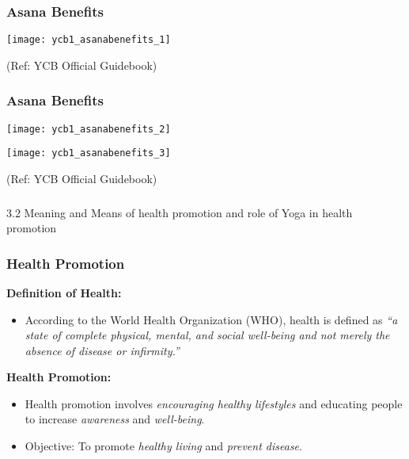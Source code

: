 \begin{frame}[fragile]\frametitle{Asana Benefits}


		\begin{center}
		\texttt{[image: ycb1\_asanabenefits\_1]}
				
		\end{center}	

  
		{\tiny (Ref: YCB Official Guidebook)}		
  
\end{frame}



\begin{frame}[fragile]\frametitle{Asana Benefits}


		\begin{center}
		\texttt{[image: ycb1\_asanabenefits\_2]}
		
		\texttt{[image: ycb1\_asanabenefits\_3]}
		
				
		\end{center}	

  
		{\tiny (Ref: YCB Official Guidebook)}		
  
\end{frame}


\begin{frame}[fragile]\frametitle{}
\begin{center}
{\Large 3.2  Meaning and Means of health promotion and role of Yoga  in health promotion}
\end{center}
\end{frame}

\begin{frame}[fragile]\frametitle{Health Promotion}
    \textbf{Definition of Health:}
    \begin{itemize}
        \item According to the World Health Organization (WHO), health is defined as \textit{“a state of complete physical, mental, and social well-being and not merely the absence of disease or infirmity.”}
    \end{itemize}

    \textbf{Health Promotion:}
    \begin{itemize}
        \item Health promotion involves \textit{encouraging healthy lifestyles} and educating people to increase \textit{awareness} and \textit{well-being}.
        \item Objective: To promote \textit{healthy living} and \textit{prevent disease}.
    \end{itemize}
\end{frame}

